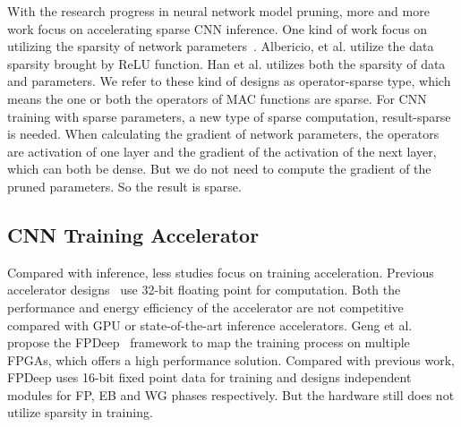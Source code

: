 With the research progress in neural network model pruning, more and more work focus on accelerating sparse CNN inference. One kind of work focus on utilizing the sparsity of network parameters~\cite{han2017ese,zhang2016cambricon}. Albericio, et al.\cite{albericio2016cnvlutin} utilize the data sparsity brought by ReLU function. Han et al. \cite{han2016eie} utilizes both the sparsity of data and parameters. We refer to these kind of designs as operator-sparse type, which means the one or both the operators of MAC functions are sparse. For CNN training with sparse parameters, a new type of sparse computation, result-sparse is needed. When calculating the gradient of network parameters, the operators are activation of one layer and the gradient of the activation of the next layer, which can both be dense. But we do not need to compute the gradient of the pruned parameters. So the result is sparse.

\subsection{CNN Training Accelerator}\label{sec:rw:train_acc}
Compared with inference, less studies focus on training acceleration. Previous accelerator designs~\cite{liu2017fpga, zhao2016f} use 32-bit floating point for computation. Both the performance and energy efficiency of the accelerator are not competitive compared with GPU or state-of-the-art inference accelerators. Geng et al. propose the FPDeep~\cite{geng2018fpdeep} framework to map the training process on multiple FPGAs, which offers a high performance solution. Compared with previous work, FPDeep uses 16-bit fixed point data for training and designs independent modules for FP, EB and WG phases respectively. But the hardware still does not utilize sparsity in training.

